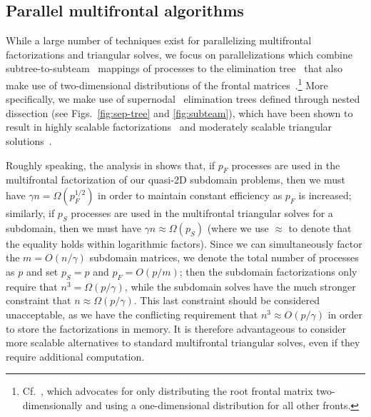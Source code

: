 \subsection{Parallel multifrontal algorithms}
\label{subsection:parallel-multifrontal}
While a large number of techniques exist for parallelizing multifrontal
factorizations and triangular solves, we focus on parallelizations 
which combine subtree-to-subteam~\cite{GeorgeLiuNg-subtree} mappings of 
processes to the elimination tree~\cite{Schreiber-etree} that also make use of 
two-dimensional distributions of the frontal 
matrices~\cite{Schreiber-scalability}.\footnote{Cf.~\cite{Amestoy-MUMPS}, which
advocates for only distributing the root frontal matrix two-dimensionally and 
using a one-dimensional distribution for all other fronts.}
More specifically, we make use of supernodal~\cite{Ashcraft-progress} 
elimination trees defined through nested dissection
(see Figs.~\ref{fig:sep-tree} and \ref{fig:subteam}), which have been shown to 
result in highly scalable 
factorizations~\cite{GuptaKarypisKumar-scalable,GuptaKoricGeorge-massive} and 
moderately scalable triangular solutions~\cite{JoshiGuptaKarypisKumar-2d}. 


Roughly speaking, the analysis in \cite{JoshiGuptaKarypisKumar-2d} shows that, 
if $p_F$ processes are used in the multifrontal factorization of our quasi-2D 
subdomain problems, then we must have $\gamma n=\Omega(p_F^{1/2})$ in order to 
maintain constant efficiency as $p_F$ is increased; similarly, if $p_S$ 
processes are used in the multifrontal triangular solves for a subdomain, 
then we must have $\gamma n\approx \Omega(p_S)$
(where we use $\approx$ to denote that the equality holds within logarithmic 
factors). 
Since we can simultaneously factor the $m=O(n/\gamma)$ subdomain 
matrices, we denote the total number of processes as $p$ and set 
$p_S=p$ and $p_F=O(p/m)$; then the subdomain factorizations only require
that $n^3=\Omega(p/\gamma)$, while the subdomain solves have the 
much stronger constraint that $n \approx \Omega(p/\gamma)$. 
This last constraint should be considered unacceptable, as we have the 
conflicting requirement that $n^3 \approx O(p/\gamma)$ in 
order to store the factorizations in memory. It is therefore advantageous to 
consider more scalable alternatives to standard multifrontal triangular solves, 
even if they require additional computation.

